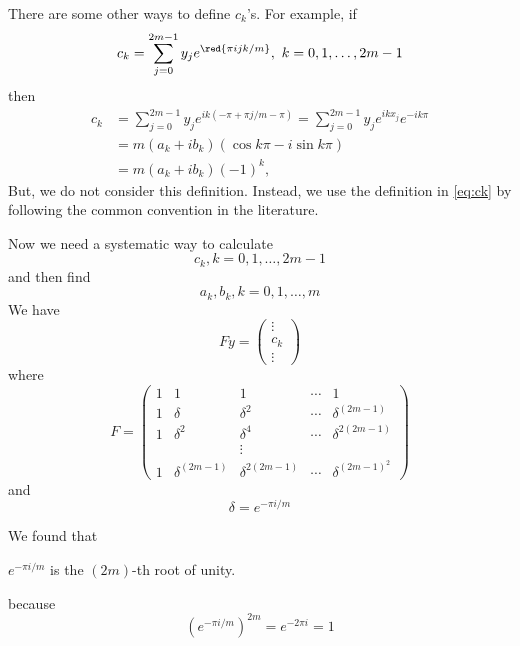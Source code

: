 \begin{note}
    There are some other ways to define $c_k$'s. For example, if \[
        c_k = \sum_{j=0}^{2m-1} y_j e^{\red{\pi i j k /m}},\ k = 0, 1, \dots, 2m-1
    \]
    then \begin{equation*}
    \begin{split}
    c_k & = \sum_{j=0}^{2m-1} y_j e^{ik(-\pi + \pi j/m - \pi)}
    = \sum_{j=0}^{2m-1} y_j e^{ikx_j} e^{-i k \pi}\\
    & = m (a_k + i b_k)(\cos k\pi - i \sin k\pi)\\
    & = m (a_k + i b_k)(-1)^k,
    \end{split}
    \end{equation*}
    But, we do not consider this definition. Instead, we use the definition in \eqref{eq:ck} by following the common convention in the literature.
\end{note}

Now we need a systematic way to calculate \[
    c_k, k = 0, 1, \dots, 2m-1
\]
and then find \[
    a_k, b_k, k = 0, 1, \dots, m
\]
We have \[
    Fy = \begin{pmatrix}
        \vdots \\
        c_k \\
        \vdots
    \end{pmatrix}
\]
where \[
    F = \begin{pmatrix}
        1 & 1 & 1& \cdots & 1 \\
        1 & \delta & \delta^2 & \cdots & \delta^{(2m-1)}\\
        1 & \delta^2 & \delta^4 & \cdots & \delta^{2(2m-1)}\\
        &&\vdots &&\\
        1 & \delta^{(2m-1)} & \delta^{2(2m-1)} & \cdots & \delta^{(2m-1)^2}
    \end{pmatrix}
\]
and \[
    \delta = e^{-\pi i / m}
\]

\begin{note}
    We found that \begin{center}
        $e^{-\pi i / m}$ is the $(2m)$-th root of unity.
    \end{center}
    because \[
        \left(e^{-\pi i / m}\right)^{2m} = e^{-2\pi i} = 1
    \]
\end{note}

